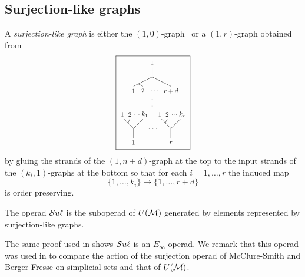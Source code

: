 \subsection{Surjection-like graphs} \label{ss:surjection-like graphs}

A \textit{surjection-like graph} is either the $(1,0)$-graph \counit\ or a $(1, r)$-graph obtained from
\begin{equation*}
	\def\r{.8}
	\boxed{\begin{tikzpicture}[scale=.4]
	\node[scale=\r] at (5,8){$1$};
	
	\draw (3,5.5)--(5,6.5)--(5,7.5);
	\draw (7,5.5)--(5,6.5);
	\draw (4,5.5)--(3.5,5.75);
	
	\node[scale=\r] at (3,5){$1$};
	\node[scale=\r] at (4,5){$2$};
	\node[scale=\r] at (5.3,5){$\dots$};
	\node[scale=\r] at (7,5){$r+d$};
	
	\node at (5,4){$\vdots$};
	
	\node[scale=\r] at (1.8, 2.5){$1$};
	\node[scale=\r] at (2.6, 2.5){$2$};
	\node[scale=\r*.7] at (3.4, 2.5){$\dots$};
	\node[scale=\r] at (4.2, 2.5){$k_1$};
	
	\draw (2,2)--(3,1)--(3,0);
	\draw (4,2)--(3,1);
	\draw (2.6,2)--(2.4,1.6);
	
	\node[scale=\r] at (3,-.5){$1$};
	
	\node at (5,1){\ $\cdots$};
	
	\node[scale=\r] at (5.8, 2.5){$1$};
	\node[scale=\r] at (6.6, 2.5){$2$};
	\node[scale=\r*.7] at (7.4, 2.5){$\dots$};
	\node[scale=\r] at (8.2, 2.5){$k_r$};
	
	\draw (6,2)--(7,1)--(7,0);
	\draw (8,2)--(7,1);
	\draw (6.6,2)--(6.4,1.6);
	
	\node[scale=\r] at (7,-.5){$r$};	
	\end{tikzpicture}}
\end{equation*}
by gluing the strands of the $(1,n+d)$-graph at the top to the input strands of the $(k_i,1)$-graphs at the bottom so that for each $i = 1, \dots, r$ the induced map 
\begin{equation*}
\{1, \dots, k_i\} \to \{1, \dots, r+d\}
\end{equation*}
is order preserving.

\begin{definition}
	The operad $\mathcal{S}u\ell$ is the suboperad of $U(\mathcal{M})$ generated by elements represented by surjection-like graphs.
\end{definition}

The same proof used in \cite[Theorem 3.3.]{medina2020prop1} shows $\mathcal{S}u\ell$ is an $E_\infty$ operad.
We remark that this operad was used in \cite[Theorem A.11.]{medina2020prop1} to compare the action of the surjection operad of McClure-Smith \cite{mcclure2003multivariable} and Berger-Fresse \cite{berger2004combinatorial} on simplicial sets and that of $U(\mathcal{M})$.

